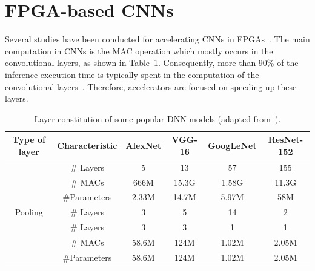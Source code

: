 \section{FPGA-based CNNs}
\label{section:fpga_cnn}

Several studies have been conducted for accelerating CNNs in FPGAs~\citep{ma:loop_opt, sze:dnn_survey, Abdelouahab:dnn_survey, Guo:dnn_survey}. The main computation in CNNs is the MAC operation which mostly occurs in the convolutional layers, as shown in Table~\ref{tab:DNN}. Consequently, more than 90\% of the inference execution time is typically spent in the computation of the convolutional layers~\cite{Abdelouahab:dnn_survey}. Therefore, accelerators are focused on speeding-up these layers.

\vspace{+0.1cm}
\begin{table}[!htb]
    \footnotesize
    \centering
    \caption{Layer constitution of some popular DNN models (adapted from~\cite{Abdelouahab:dnn_survey}).}
    \label{tab:DNN}
    \begin{tabular}{|c|c|c|c|c|c|}
    \hline
            Type of layer              &  Characteristic & AlexNet &   VGG-16   &  GoogLeNet  &    ResNet-152  \\ \hline
   {\multirow{3}{*}{{Convolutional}}}  &     \# Layers   &    5    &    13     &      57     &     155    \\ \cline{2-6}
                                       &     \# MACs     &   666M  &   15.3G   &    1.58G    &    11.3G   \\ \cline{2-6} 
                                       &  \#Parameters   &  2.33M  &   14.7M   &    5.97M    &     58M    \\ \hline
              Pooling                  &      \# Layers   &    3    &    5     &      14     &      2     \\ \hline 
  {\multirow{3}{*}{{Fully Connected}}} &     \# Layers   &     3    &    3     &      1      &      1     \\ \cline{2-6}
                                       &     \# MACs     &   58.6M  &   124M   &    1.02M    &    2.05M   \\ \cline{2-6} 
                                       &  \#Parameters   &   58.6M  &   124M   &    1.02M    &    2.05M   \\ \hline
    \end{tabular}
\end{table}

